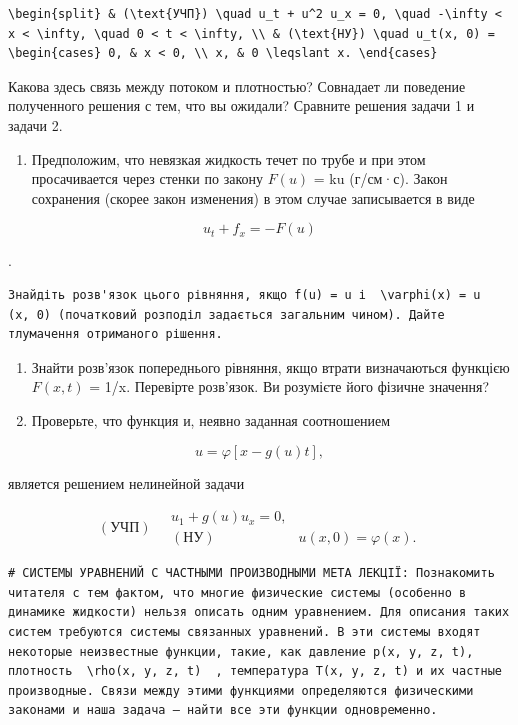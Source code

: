 \documentclass[
  ukrainian,
]{article}
\providecommand{\tightlist}{%
  \setlength{\itemsep}{0pt}\setlength{\parskip}{0pt}}
\begin{document}
\begin{verbatim}
\begin{split} & (\text{УЧП}) \quad u_t + u^2 u_x = 0, \quad -\infty < x < \infty, \quad 0 < t < \infty, \\ & (\text{НУ}) \quad u_t(x, 0) = \begin{cases} 0, & x < 0, \\ x, & 0 \leqslant x. \end{cases}
\end{verbatim}

Какова здесь связь между потоком и плотностью? Совнадает ли поведение
полученного решения с тем, что вы ожидали? Сравните решения задачи 1 и
задачи 2.

\begin{enumerate}
\def\labelenumi{\arabic{enumi}.}
\setcounter{enumi}{2}
\tightlist
\item
  Предположим, что невязкая жидкость течет по трубе и при этом
  просачивается через стенки по закону \(F(u)\) = ku (г/см·с). Закон
  сохранения (скорее закон изменения) в этом случае записывается в виде
\end{enumerate}

\[
u_t + f_x = -F(u)
\]

.

\begin{verbatim}
Знайдіть розв'язок цього рівняння, якщо f(u) = u і  \varphi(x) = u  (x, 0) (початковий розподіл задається загальним чином). Дайте тлумачення отриманого рішення.
\end{verbatim}

\begin{enumerate}
\def\labelenumi{\arabic{enumi}.}
\setcounter{enumi}{3}
\item
  Знайти розв'язок попереднього рівняння, якщо втрати визначаються
  функцією \(F(x, t)\) = 1/x. Перевірте розв'язок. Ви розумієте його
  фізичне значення?
\item
  Проверьте, что функция и, неявно заданная соотношением
\end{enumerate}

\[
u = \varphi[x - g(u) t],
\]

является решением нелинейной задачи

\[
(\text{УЧП}) \quad \begin{array}{ll} u_1 + g(u) u_x = 0, \\ (\text{НУ}) & u(x, 0) = \varphi(x). \end{array}
\]

\begin{verbatim}
# СИСТЕМЫ УРАВНЕНИЙ С ЧАСТНЫМИ ПРОИЗВОДНЫМИ МЕТА ЛЕКЦІЇ: Познакомить читателя с тем фактом, что многие физические системы (особенно в динамике жидкости) нельзя описать одним уравнением. Для описания таких систем требуются системы связанных уравнений. В эти системы входят некоторые неизвестные функции, такие, как давление p(x, y, z, t), плотность  \rho(x, y, z, t)  , температура T(x, y, z, t) и их частные производные. Связи между этими функциями определяются физическими законами и наша задача — найти все эти функции одновременно.
\end{verbatim}
\end{document}
